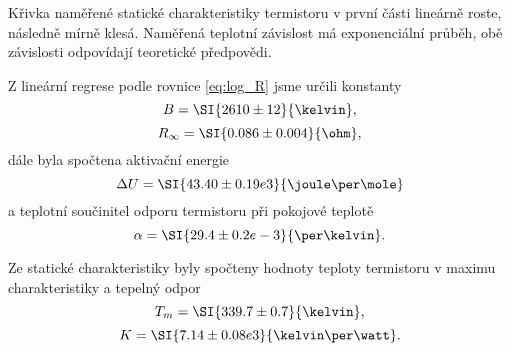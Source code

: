 \documentclass[0-protokol.tex]{subfiles}
\begin{document}
Křivka naměřené statické charakteristiky termistoru v první části lineárně roste, následně mírně klesá. Naměřená teplotní závislost má exponenciální průběh, obě závislosti odpovídají teoretické předpovědi.

Z lineární regrese podle rovnice \eqref{eq:log_R} jsme určili konstanty
$$ B = \SI{2610 \pm 12}{\kelvin}, $$
$$ R_\infty = \SI{0.086 \pm 0.004}{\ohm}, $$
dále byla spočtena aktivační energie 
$$ \Delta U = \SI{43.40 \pm 0.19 e3}{\joule\per\mole} $$
a teplotní součinitel odporu termistoru při pokojové teplotě
$$ \alpha = \SI{29.4 \pm 0.2 e-3}{\per\kelvin}. $$

Ze statické charakteristiky byly spočteny hodnoty teploty termistoru v maximu charakteristiky a tepelný odpor
$$ T_m = \SI{339.7 \pm 0.7}{\kelvin}, $$
$$ K = \SI{7.14 \pm 0.08 e3}{\kelvin\per\watt}. $$
\end{document}
